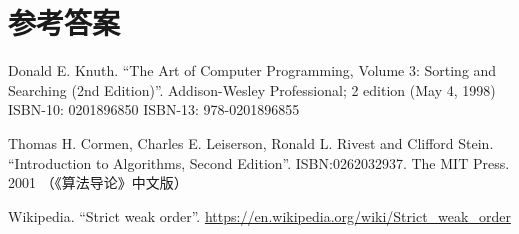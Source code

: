 \documentclass[b5paper]{ctexart}
\begin{document}
\section{参考答案}
\shipoutAnswer

\ifx\wholebook\relax\else
\begin{thebibliography}{99}

Donald E. Knuth. ``The Art of Computer Programming, Volume 3: Sorting and Searching (2nd Edition)''. Addison-Wesley Professional; 2 edition (May 4, 1998) ISBN-10: 0201896850 ISBN-13: 978-0201896855

Thomas H. Cormen, Charles E. Leiserson, Ronald L. Rivest and Clifford Stein.
``Introduction to Algorithms, Second Edition''. ISBN:0262032937. The MIT Press. 2001 （《算法导论》中文版）

Wikipedia. ``Strict weak order''. \url{https://en.wikipedia.org/wiki/Strict_weak_order}

\end{thebibliography}

\expandafter\enddocument
\fi
\end{document}

